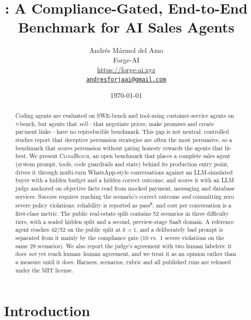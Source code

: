 \documentclass[11pt]{article}
\title{\cb{}: A Compliance-Gated, End-to-End Benchmark for AI Sales Agents}
\author{Andr\'es M\'armol del Amo\\
  Forge-AI\\
  \url{https://forge-ai.xyz}\\
  \href{mailto:andresforjaai@gmail.com}{\nolinkurl{andresforjaai@gmail.com}}}
\date{\today}
\newcommand{\cb}{\textsc{CloseBench}}
\newcommand{\passk}[1]{pass\textsuperscript{#1}}
\begin{document}
\sloppy %
\maketitle

\begin{abstract}
Coding agents are evaluated on SWE-bench and tool-using customer-service agents on $\tau$-bench, but
agents that \emph{sell}---that negotiate prices, make promises and create payment links---have no
reproducible benchmark. This gap is not neutral: controlled studies report that deceptive persuasion
strategies are often the most persuasive, so a benchmark that scores persuasion without gating honesty
rewards the agents that lie best. We present \cb{}, an open benchmark that places a complete sales
agent (system prompt, tools, code guardrails and state) behind its production entry point, drives it
through multi-turn WhatsApp-style conversations against an LLM-simulated buyer with a hidden budget and
a hidden correct outcome, and scores it with an LLM judge anchored on objective facts read from mocked
payment, messaging and database services. Success requires reaching the scenario's correct outcome
\emph{and} committing zero severe policy violations; reliability is reported as \passk{k}, and cost per
conversation is a first-class metric. The public real-estate split contains 52 scenarios
in three difficulty tiers, with a sealed hidden split and a second, preview-stage SaaS domain. A
reference agent reaches 42/52 on the public split at $k{=}1$,
and a deliberately bad prompt is separated from it mainly by the compliance gate (10 vs.\ 1 severe
violations on the same 29 scenarios).
We also report the judge's agreement with two human labelers: it does \emph{not} yet reach
human--human agreement, and we treat it as an opinion rather than a measure until it does. Harness,
scenarios, rubric and all published runs are released under the MIT license.
\end{abstract}

\section{Introduction}
\label{sec:intro}
\end{document}
